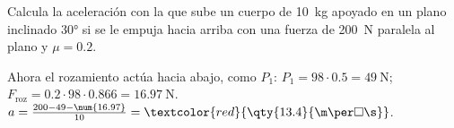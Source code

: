 \begin{exercise}
    Calcula la aceleración con la que sube un cuerpo de \qty{10}{\kg} apoyado en un plano inclinado \ang{30} si se le empuja hacia arriba con una fuerza de \qty{200}{\newton} paralela al plano y \(\mu = \num{0.2}\).
    \begin{solu}
        Ahora el rozamiento actúa hacia abajo, como \(P_1\): \(P_1 = 98 \cdot \num{0.5} = \qty{49}{\newton}\); \(F_\text{roz} = \num{0.2} \cdot 98 \cdot \num{0.866} = \qty{16.97}{\newton}\).
        \(a = \frac{200 - 49 - \num{16.97}}{10} = \textcolor{red}{\qty{13.4}{\m\per\square\s}}\).
    \end{solu}
\end{exercise}
